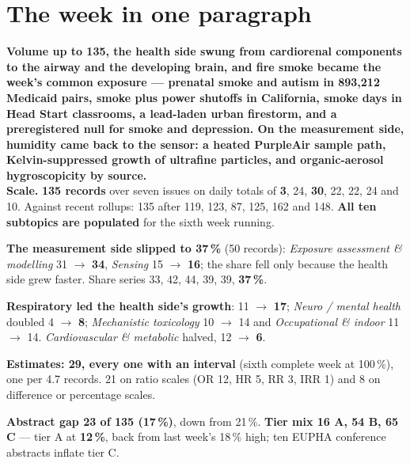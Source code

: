 \documentclass[10pt]{article}
\begin{document}
\vspace{6mm}

\section*{\sffamily\bfseries\color{Deep}The week in one paragraph}
\vspace{-1.5mm}{\color{Teal}\rule{\linewidth}{1.1pt}}\vspace{2.5mm}

\begin{keybox}
{\sffamily\bfseries\small\color{Deep}Volume up to 135, the health side swung from cardiorenal components to the
airway and the developing brain, and fire smoke became the week's common exposure --- prenatal smoke and autism
in 893,212 Medicaid pairs, smoke plus power shutoffs in California, smoke days in Head Start classrooms, a lead-laden
urban firestorm, and a preregistered null for smoke and depression. On the measurement side, humidity came back to
the sensor: a heated PurpleAir sample path, Kelvin-suppressed growth of ultrafine particles, and organic-aerosol
hygroscopicity by source.}\\[1.4mm]
\footnotesize
\textbf{Scale.} \textbf{135 records} over seven issues on daily totals of \textbf{3}, 24, \textbf{30}, 22, 22,
24 and 10. Against recent rollups: 135 after 119, 123, 87, 125, 162 and 148. \textbf{All ten subtopics are
populated} for the sixth week running.

\textbf{The measurement side slipped to 37\,\%} (50 records): \textit{Exposure assessment \& modelling}
31 $\rightarrow$ \textbf{34}, \textit{Sensing} 15 $\rightarrow$ \textbf{16}; the share fell only because the health side
grew faster. Share series 33, 42, 44, 39, 39, \textbf{37\,\%}.

\textbf{Respiratory led the health side's growth}: 11 $\rightarrow$ \textbf{17}; \textit{Neuro / mental health}
doubled 4 $\rightarrow$ \textbf{8}; \textit{Mechanistic toxicology} 10 $\rightarrow$ 14 and \textit{Occupational
\& indoor} 11 $\rightarrow$ 14. \textit{Cardiovascular \& metabolic} halved, 12 $\rightarrow$ \textbf{6}.

\textbf{Estimates: 29, every one with an interval} (sixth complete week at 100\,\%), one per 4.7 records. 21 on
ratio scales (OR 12, HR 5, RR 3, IRR 1) and 8 on difference or percentage scales.

\textbf{Abstract gap 23 of 135 (17\,\%)}, down from 21\,\%. \textbf{Tier mix 16 A, 54 B, 65 C} --- tier A at
\textbf{12\,\%}, back from last week's 18\,\% high; ten EUPHA conference abstracts inflate tier C.
\end{keybox}
\end{document}
